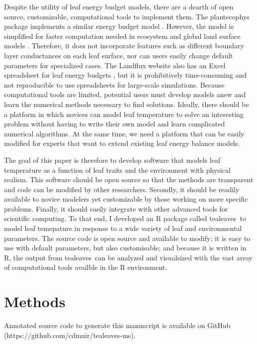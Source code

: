 \documentclass[11pt, oneside]{article}
\newcommand{\pkg}[1]{{\fontseries{b}\selectfont #1}}
\newcommand{\tealeaves}{\pkg{tealeaves}}
\begin{document}
Despite the utility of leaf energy budget models, there are a dearth of open source, customizable, computational tools to implement them. The \pkg{plantecophys} package implements a similar energy budget model \citep{Duursma_2015}. However, the model is simplified for faster computation needed in ecosystem and global land surface models \citep{Leuning_etal_1995}. Therefore, it does not incorporate features such as different boundary layer conductances on each leaf surface, nor can users easily change default parameters for specialized cases. The Landflux website also has an Excel spreadsheet for leaf energy budgets \citep{Landflux_2019}, but it is prohibitively time-consuming and not reproducible to use spreadsheets for large-scale simulations. Because computational tools are limited, potential users must develop models anew and learn the numerical methods necessary to find solutions. Ideally, there should be a platform in which novices can model leaf temperature to solve an interesting problem without having to write their own model and learn complicated numerical algorithms. At the same time, we need a platform that can be easily modified for experts that want to extend existing leaf energy balance models.

The goal of this paper is therefore to develop software that models leaf temperature as a function of leaf traits and the environment with physical realism. This software should be open source so that the methods are transparent and code can be modified by other researchers. Secondly, it should be readily available to novice modelers yet customizable by those working on more specific problems. Finally, it should easily integrate with other advanced tools for scientific computing. To that end, I developed an R package called \tealeaves~to model leaf temepature in response to a wide variety of leaf and environmental parameters. The source code is open source and available to modify; it is easy to use with default parameters, but also customisable; and because it is written in R, the output from \tealeaves~can be analyzed and visualsized with the vast array of computational tools availble in the R environment. 

\section*{Methods}

Annotated source code to generate this manuscript is available on GitHub (https://github.com/cdmuir/tealeaves-ms).
\end{document}
